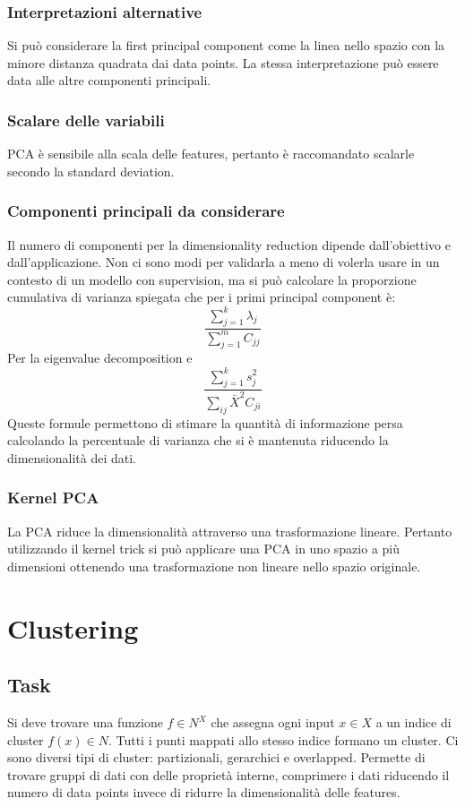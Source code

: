 		\subsubsection{Interpretazioni alternative}
		Si pu\`o considerare la first principal component come la linea nello spazio con la minore distanza quadrata dai data points.
		La stessa interpretazione pu\`o essere data alle altre componenti principali.

		\subsubsection{Scalare delle variabili}
		PCA \`e sensibile alla scala delle features, pertanto \`e raccomandato scalarle secondo la standard deviation.

		\subsubsection{Componenti principali da considerare}
		Il numero di componenti per la dimensionality reduction dipende dall'obiettivo e dall'applicazione.
		Non ci sono modi per validarla a meno di volerla usare in un contesto di un modello con supervision, ma si pu\`o calcolare la proporzione cumulativa di varianza spiegata che per i primi principal component \`e:
		$$\frac{\sum\limits_{j = 1}^k\lambda_j}{\sum\limits_{j = 1}^m C_{jj}}$$
		Per la eigenvalue decomposition e
		$$\frac{\sum\limits_{j = 1}^ks^2_j}{\sum\limits_{ij} \bar{X}^2C_{ji}}$$
		Queste formule permettono di stimare la quantit\`a di informazione persa calcolando la percentuale di varianza che si \`e mantenuta riducendo la dimensionalit\`a dei dati.

		\subsubsection{Kernel PCA}
		La PCA riduce la dimensionalit\`a attraverso una trasformazione lineare.
		Pertanto utilizzando il kernel trick si pu\`o applicare una PCA in uno spazio a pi\`u dimensioni ottenendo una trasformazione non lineare nello spazio originale.

\section{Clustering}

	\subsection{Task}
	Si deve trovare una funzione $f\in N^X$ che assegna ogni input $x\in X$ a un indice di cluster $f(x)\in N$.
	Tutti i punti mappati allo stesso indice formano un cluster.
	Ci sono diversi tipi di cluster: partizionali, gerarchici e overlapped.
	Permette di trovare gruppi di dati con delle propriet\`a interne, comprimere i dati riducendo il numero di data points invece di ridurre la dimensionalit\`a delle features.

